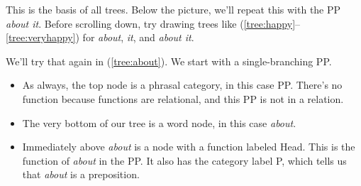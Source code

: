 \ea {}\label{tree:veryhappy}
\z
{}

This is the basis of all trees. Below the picture, we'll repeat this with the PP \textit{about it}. Before scrolling down, try drawing trees like (\ref{tree:happy}--\ref{tree:veryhappy}) for \textit{about}, \textit{it}, and \textit{about it}.

We'll try that again in (\ref{tree:about}). We start with a single-branching PP.
\begin{itemize}[noitemsep]
    \item As always, the top node is a phrasal category, in this case PP. There's no function because functions are relational, and this PP is not in a relation.
    \item The very bottom of our tree is a word node, in this case \textit{about}.
    \item Immediately above \textit{about} is a node with a function labeled Head. This is the function of \textit{about} in the PP. It also has the category label P, which tells us that \textit{about} is a preposition.
\end{itemize}

\ea {}\label{tree:about}
\z

